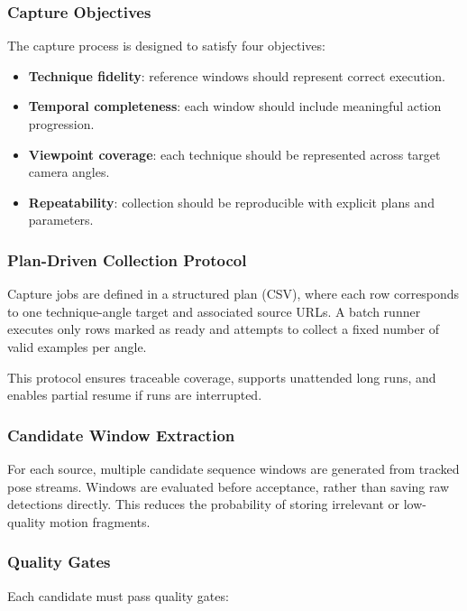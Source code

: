 \documentclass[12pt]{article}
\begin{document}
{\subsubsection{Capture Objectives}

The capture process is designed to satisfy four objectives:

\begin{itemize}
    \item \textbf{Technique fidelity}: reference windows should represent correct execution.
    \item \textbf{Temporal completeness}: each window should include meaningful action progression.
    \item \textbf{Viewpoint coverage}: each technique should be represented across target camera angles.
    \item \textbf{Repeatability}: collection should be reproducible with explicit plans and parameters.
\end{itemize}

\subsubsection{Plan-Driven Collection Protocol}

Capture jobs are defined in a structured plan (CSV), where each row corresponds to one technique-angle target and associated source URLs. A batch runner executes only rows marked as ready and attempts to collect a fixed number of valid examples per angle.

This protocol ensures traceable coverage, supports unattended long runs, and enables partial resume if runs are interrupted.

\subsubsection{Candidate Window Extraction}

For each source, multiple candidate sequence windows are generated from tracked pose streams. Windows are evaluated before acceptance, rather than saving raw detections directly. This reduces the probability of storing irrelevant or low-quality motion fragments.

\subsubsection{Quality Gates}

Each candidate must pass quality gates:

}
\end{document}
